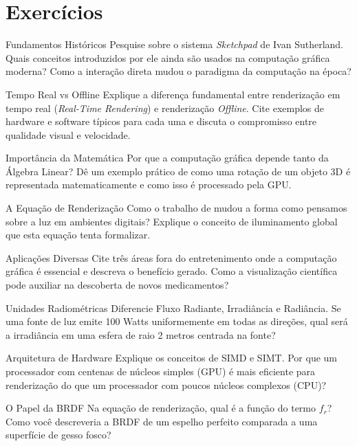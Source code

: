\section*{Exercícios}

\begin{exercicio}{Fundamentos Históricos}
    Pesquise sobre o sistema \textit{Sketchpad} de Ivan Sutherland. Quais conceitos introduzidos por ele ainda são usados na computação gráfica moderna? Como a interação direta mudou o paradigma da computação na época?
\end{exercicio}

\begin{exercicio}{Tempo Real vs Offline}
    Explique a diferença fundamental entre renderização em tempo real (\textit{Real-Time Rendering}) e renderização \textit{Offline}. Cite exemplos de hardware e software típicos para cada uma e discuta o compromisso entre qualidade visual e velocidade.
\end{exercicio}

\begin{exercicio}{Importância da Matemática}
    Por que a computação gráfica depende tanto da Álgebra Linear? Dê um exemplo prático de como uma rotação de um objeto 3D é representada matematicamente e como isso é processado pela GPU.
\end{exercicio}

\begin{exercicio}{A Equação de Renderização}
    Como o trabalho de \textcite{kajiya1986rendering} mudou a forma como pensamos sobre a luz em ambientes digitais? Explique o conceito de iluminamento global que esta equação tenta formalizar.
\end{exercicio}

\begin{exercicio}{Aplicações Diversas}
    Cite três áreas fora do entretenimento onde a computação gráfica é essencial e descreva o benefício gerado. Como a visualização científica pode auxiliar na descoberta de novos medicamentos?
\end{exercicio}

\begin{exercicio}{Unidades Radiométricas}
    Diferencie Fluxo Radiante, Irradiância e Radiância. Se uma fonte de luz emite 100 Watts uniformemente em todas as direções, qual será a irradiância em uma esfera de raio 2 metros centrada na fonte?
\end{exercicio}

\begin{exercicio}{Arquitetura de Hardware}
    Explique os conceitos de SIMD e SIMT. Por que um processador com centenas de núcleos simples (GPU) é mais eficiente para renderização do que um processador com poucos núcleos complexos (CPU)?
\end{exercicio}

\begin{exercicio}{O Papel da BRDF}
    Na equação de renderização, qual é a função do termo $f_r$? Como você descreveria a BRDF de um espelho perfeito comparada a uma superfície de gesso fosco?
\end{exercicio}
